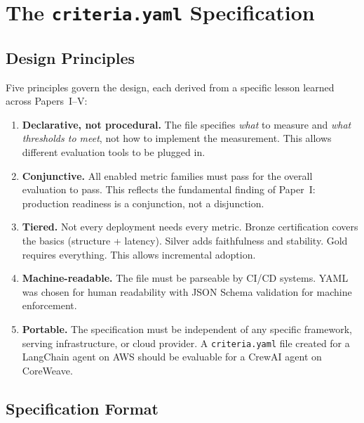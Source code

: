 \documentclass[11pt]{article}
\newcommand{\criteriayaml}{\texttt{criteria.yaml}}
\begin{document}
\section{The \criteriayaml{} Specification}
\label{sec:specification}

\subsection{Design Principles}

Five principles govern the design, each derived from a specific lesson learned across Papers~I--V:

\begin{enumerate}[leftmargin=16pt]
  \item \textbf{Declarative, not procedural.} The file specifies \emph{what} to measure and \emph{what thresholds to meet}, not how to implement the measurement. This allows different evaluation tools to be plugged in.

  \item \textbf{Conjunctive.} All enabled metric families must pass for the overall evaluation to pass. This reflects the fundamental finding of Paper~I: production readiness is a conjunction, not a disjunction.

  \item \textbf{Tiered.} Not every deployment needs every metric. Bronze certification covers the basics (structure + latency). Silver adds faithfulness and stability. Gold requires everything. This allows incremental adoption.

  \item \textbf{Machine-readable.} The file must be parseable by CI/CD systems. YAML was chosen for human readability with JSON Schema validation for machine enforcement.

  \item \textbf{Portable.} The specification must be independent of any specific framework, serving infrastructure, or cloud provider. A \criteriayaml{} file created for a LangChain agent on AWS should be evaluable for a CrewAI agent on CoreWeave.
\end{enumerate}

\subsection{Specification Format}
\end{document}
